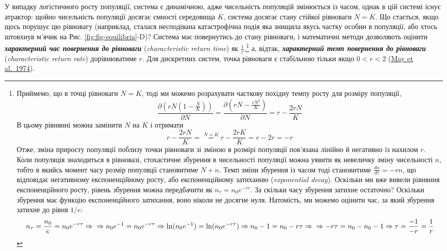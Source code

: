 \documentclass[
  11pt,
]{book}
\begin{document}
У випадку логістичного росту популяції, система є динамічною, адже чисельність популяцій змінюється із часом, однак в цій системі існує атрактор: щойно чисельність популяції досягає ємності середовища \(K\), система досягає стану стійкої рівноваги \(N=K\). Що стається, якщо щось порушує цю рівновагу (наприклад, сталася несподівана катастрофічна подія яка знищила якусь частку особин в популяції, або хтось штовхнув м'ячик на Рис. \ref{fig:fig-equilibria}-D)? Система має повернутись до стану рівноваги, і математичні методи дозволяють оцінити \textbf{\emph{характерний час повернення до рівноваги}} (\emph{characteristic return time}) як \(\frac{1}{r}\),\footnote{Приймемо, що в точці рівноваги \(N = K\), тоді ми можемо розрахувати часткову похідну темпу росту для розміру популяції, \[\frac{\partial \left( rN (1 - \frac{N}{K}) \right)}{\partial N} = \frac{\partial \left( rN- \frac{rN^2}{K} \right)}{\partial N} = r - \frac{2rN}{K}\] В цьому рівнянні можна замінити \(N\) на \(K\) і отримати \[r - \frac{2rN}{K} = \stackrel{N = K}{=} r - \frac{2rK}{K} = r - 2r = -r\] Отже, зміна приросту популяції поблизу точки рівноваги зі зміною в розмірі популяції пов'язана лінійно й негативно із нахилом \(r\). Коли популяція знаходиться в рівновазі, стохастичне збурення в чисельності популяції можна уявити як невеличку зміну чисельності \(n\), тобто в якийсь момент часу розмір популяції становитиме \(N + n\). Темп зміни збурення із часом тоді становитиме \(\frac{dn}{d\tau} = -rn\), що відповідає негативному експоненційному росту, або експоненційному затиханню (\emph{exponential decay}). Оскільки ми вже вивели рівняння експоненційного росту, рівень збурення можна передбачити як \(n_\tau = n_0 e^{-r\tau}\). За скільки часу збурення затихне остаточно? Оскільки збурення має функцію експоненційного затихання, воно ніколи не досягне нуля. Натомість, ми можемо оцінити час, за який збурення затихне до рівня \(1/e\): \[n_\tau = \frac{n_0}{e} = n_0 e^{-r\tau} \Rightarrow \\ \Rightarrow n_0 e^{-1} = n_0 e^{-r\tau} \Rightarrow \ln(n_0 e^{-1}) = \ln(n_0 e^{-r\tau}) \Rightarrow n_0 - 1 = n_0 - r\tau \Rightarrow \\ \Rightarrow -r\tau = n_0 - n_0 - 1 \Rightarrow \tau = \frac{-1}{-r} = \frac{1}{r}\]} а, відтак, \textbf{\emph{характерний темп повернення до рівноваги}} (\emph{characteristic return rate}) дорівнюватиме \(r\). Для дискретних систем, точка рівноваги є стабільною тільки якщо \(0 < r < 2\) (\href{https://doi.org/10.2307/3535}{May et al.~1974}).
\end{document}
